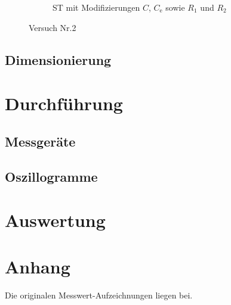 \documentclass[numbers=noenddot,10pt,a4paper]{scrartcl}
\newcommand{\indx}[1]{_\text{#1}}
\begin{document}
\begin{figure}[H]
\begin{subfigure}[b]{0.49\textwidth}
\caption{ST mit Modifizierungen $C$, $C\indx{e}$ sowie $R_1$ und $R_2$}
\end{subfigure}
\caption{Versuch Nr.2}
\end{figure}
\subsection{Dimensionierung}
\section{Durchführung}
\subsection{Messgeräte}
\subsection{Oszillogramme}
\section{Auswertung}
\section{Anhang}
Die originalen Messwert-Aufzeichnungen liegen bei.
\end{document}
